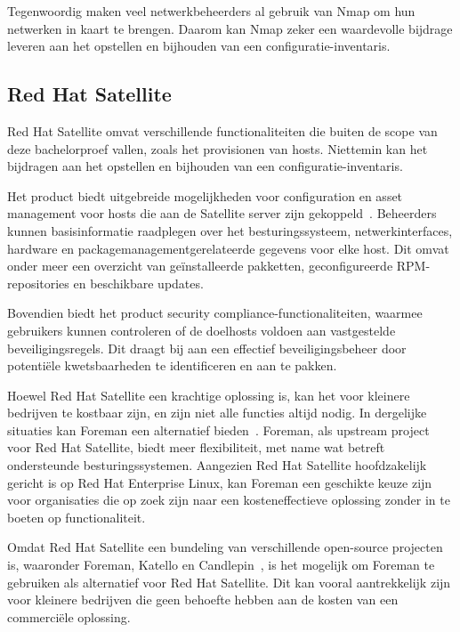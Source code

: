 Tegenwoordig maken veel netwerkbeheerders al gebruik van Nmap om hun netwerken in kaart te brengen.
Daarom kan Nmap zeker een waardevolle bijdrage leveren aan het opstellen en bijhouden van een configuratie-inventaris.

\subsection{Red Hat Satellite}
\label{sub:red-hat-satellite}

Red Hat Satellite omvat verschillende functionaliteiten die buiten de scope van deze bachelorproef vallen, zoals het provisionen van hosts.
Niettemin kan het bijdragen aan het opstellen en bijhouden van een configuratie-inventaris.

Het product biedt uitgebreide mogelijkheden voor configuration en asset management voor hosts die aan de Satellite server zijn gekoppeld~\autocite{rhel-satellite-hosts}.
Beheerders kunnen basisinformatie raadplegen over het besturingssysteem, netwerkinterfaces, hardware en packagemanagementgerelateerde gegevens voor elke host.
Dit omvat onder meer een overzicht van geïnstalleerde pakketten, geconfigureerde RPM-repositories en beschikbare updates.

Bovendien biedt het product security compliance-functionaliteiten, waarmee gebruikers kunnen controleren of de doelhosts voldoen aan vastgestelde beveiligingsregels.
Dit draagt bij aan een effectief beveiligingsbeheer door potentiële kwetsbaarheden te identificeren en aan te pakken.

Hoewel Red Hat Satellite een krachtige oplossing is, kan het voor kleinere bedrijven te kostbaar zijn, en zijn niet alle functies altijd nodig.
In dergelijke situaties kan Foreman een alternatief bieden~\autocite{foreman-introduction}.
Foreman, als upstream project voor Red Hat Satellite, biedt meer flexibiliteit, met name wat betreft ondersteunde besturingssystemen.
Aangezien Red Hat Satellite hoofdzakelijk gericht is op Red Hat Enterprise Linux, kan Foreman een geschikte keuze zijn voor organisaties die op zoek zijn naar een kosteneffectieve oplossing zonder in te boeten op functionaliteit.

Omdat Red Hat Satellite een bundeling van verschillende open-source projecten is, waaronder Foreman, Katello en Candlepin~\autocite{rhel-satellite-6-introduction}, is het mogelijk om Foreman te gebruiken als alternatief voor Red Hat Satellite.
Dit kan vooral aantrekkelijk zijn voor kleinere bedrijven die geen behoefte hebben aan de kosten van een commerciële oplossing.

